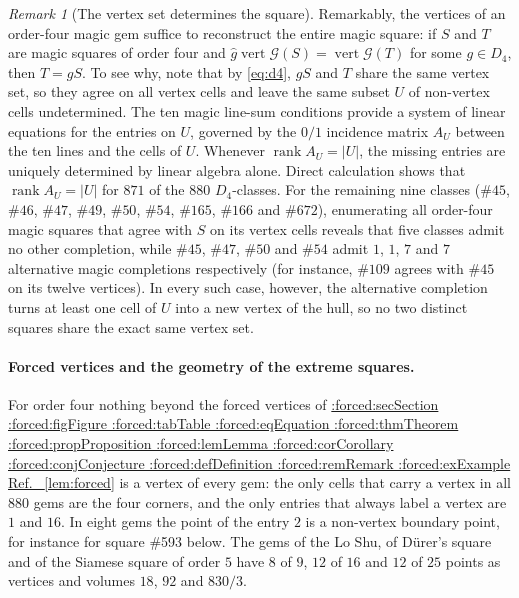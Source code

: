 \documentclass[11pt,a4paper]{article}
\makeatletter
\def\Cref@getprefix#1:#2\relax{#1}
\def\Cref@prefix@sec{sec}
\def\Cref@prefix@fig{fig}
\def\Cref@prefix@tab{tab}
\def\Cref@prefix@eq{eq}
\def\Cref@prefix@thm{thm}
\def\Cref@prefix@prop{prop}
\def\Cref@prefix@lem{lem}
\def\Cref@prefix@cor{cor}
\def\Cref@prefix@conj{conj}
\def\Cref@prefix@def{def}
\def\Cref@prefix@rem{rem}
\def\Cref@prefix@ex{ex}
\def\Cref@type@cap#1{%
  \edef\Cref@tmp{#1}%
  \ifx\Cref@tmp\Cref@prefix@sec Section%
  \else\ifx\Cref@tmp\Cref@prefix@fig Figure%
  \else\ifx\Cref@tmp\Cref@prefix@tab Table%
  \else\ifx\Cref@tmp\Cref@prefix@eq Equation%
  \else\ifx\Cref@tmp\Cref@prefix@thm Theorem%
  \else\ifx\Cref@tmp\Cref@prefix@prop Proposition%
  \else\ifx\Cref@tmp\Cref@prefix@lem Lemma%
  \else\ifx\Cref@tmp\Cref@prefix@cor Corollary%
  \else\ifx\Cref@tmp\Cref@prefix@conj Conjecture%
  \else\ifx\Cref@tmp\Cref@prefix@def Definition%
  \else\ifx\Cref@tmp\Cref@prefix@rem Remark%
  \else\ifx\Cref@tmp\Cref@prefix@ex Example%
  \else Ref.%
  \fi\fi\fi\fi\fi\fi\fi\fi\fi\fi\fi\fi
}
\DeclareRobustCommand{\Cref}[1]{%
  \begingroup
  \edef\Cref@label{#1}%
  \edef\Cref@prefix{\expandafter\Cref@getprefix\Cref@label:\relax}%
  \hyperref[#1]{\Cref@type@cap{\Cref@prefix}~\ref*{#1}}%
  \endgroup
}
\theoremstyle{plain}
\theoremstyle{definition}
\theoremstyle{remark}
\newtheorem{remark}[theorem]{Remark}
\makeatother
\begin{document}
\begin{remark}[The vertex set determines the square]
\label{rem:vertexset}
Remarkably, the vertices of an order-four magic gem suffice to reconstruct the entire magic square: if $S$ and $T$ are magic squares of order four and $\hat g\operatorname{vert}\mathcal G(S)=\operatorname{vert}\mathcal G(T)$ for some $g\in D_4$, then $T=gS$.
To see why, note that by \eqref{eq:d4}, $gS$ and $T$ share the same vertex set, so they agree on all vertex cells and leave the same subset $U$ of non-vertex cells undetermined.
The ten magic line-sum conditions provide a system of linear equations for the entries on $U$, governed by the $0/1$ incidence matrix $A_U$ between the ten lines and the cells of $U$. Whenever $\operatorname{rank}A_U=|U|$, the missing entries are uniquely determined by linear algebra alone.
Direct calculation shows that $\operatorname{rank}A_U=|U|$ for $871$ of the $880$ $D_4$-classes.
For the remaining nine classes ($\#45$, $\#46$, $\#47$, $\#49$, $\#50$, $\#54$, $\#165$, $\#166$ and $\#672$), enumerating all order-four magic squares that agree with $S$ on its vertex cells reveals that five classes admit no other completion, while $\#45$, $\#47$, $\#50$ and $\#54$ admit $1$, $1$, $7$ and $7$ alternative magic completions respectively (for instance, $\#109$ agrees with $\#45$ on its twelve vertices). In every such case, however, the alternative completion turns at least one cell of $U$ into a new vertex of the hull, so no two distinct squares share the exact same vertex set.
\end{remark}

\paragraph{Forced vertices and the geometry of the extreme squares.}
For order four nothing beyond the forced vertices of \Cref{lem:forced} is a vertex of every gem: the only cells that carry a vertex in all $880$ gems are the four corners, and the only entries that always label a vertex are $1$ and $16$.
In eight gems the point of the entry $2$ is a non-vertex boundary point, for instance for square \#593 below.
The gems of the Lo Shu, of D\"urer's square and of the Siamese square of order $5$ have $8$ of $9$, $12$ of $16$ and $12$ of $25$ points as vertices and volumes $18$, $92$ and $830/3$.
\end{document}

